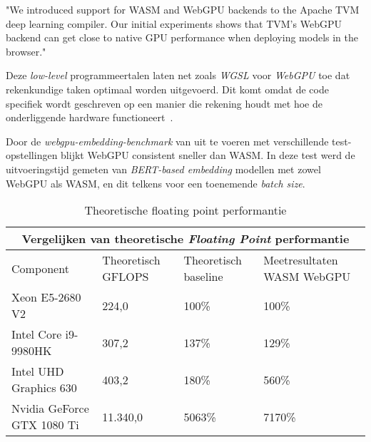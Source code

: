 \begin{displayquote}
    "We introduced support for WASM and WebGPU backends to the Apache TVM deep learning compiler. Our initial experiments shows that TVM's WebGPU backend can get close to native GPU performance when deploying models in the browser."
\end{displayquote}

Deze \textit{low-level} programmeertalen laten net zoals \textit{WGSL} voor \textit{WebGPU} toe dat rekenkundige taken optimaal worden uitgevoerd. Dit komt omdat de code specifiek wordt geschreven op een manier die rekening houdt met hoe de onderliggende hardware functioneert~\autocite{Knight2020}.

\bigbreak{}


\label{sec:transformerbench}

Door de \textit{webgpu-embedding-benchmark} van \textcite{Lochner2024} uit te voeren met verschillende test-opstellingen blijkt WebGPU consistent sneller dan WASM. In deze test werd de uitvoeringstijd gemeten van \textit{BERT-based embedding} modellen met zowel WebGPU als WASM, en dit telkens voor een toenemende \textit{batch size}.

\bigbreak{}

\begin{table}
    \begin{tabular}{ |p{5cm}|p{3cm}|p{3cm}|p{3cm}|  }
        \hline
        \multicolumn{4}{|c|}{Vergelijken van theoretische \textit{Floating Point} performantie} \\
        \hline
        Component& Theoretisch GFLOPS & Theoretisch baseline & Meetresultaten WASM WebGPU\\
        \hline
            Xeon E5-2680 V2             & 224,0     & 100\%  & 100\%       \\
            Intel Core i9-9980HK        & 307,2     & 137\%  & 129\%    \\
            Intel UHD Graphics 630      & 403,2     & 180\%  & 560\%    \\
            Nvidia GeForce GTX 1080 Ti  & 11.340,0  & 5063\% & 7170\%   \\
        \hline
    \end{tabular}
    \caption[\textit{Floating point} performantie \textit{CPU's} en \textit{GPU's} \autocite{Intel2024, Intel2024a, TechPowerUp2017, TechPowerUp2017a}]{Theoretische floating point performantie \autocite{Intel2024, Intel2024a, TechPowerUp2017, TechPowerUp2017a}}
\end{table}

